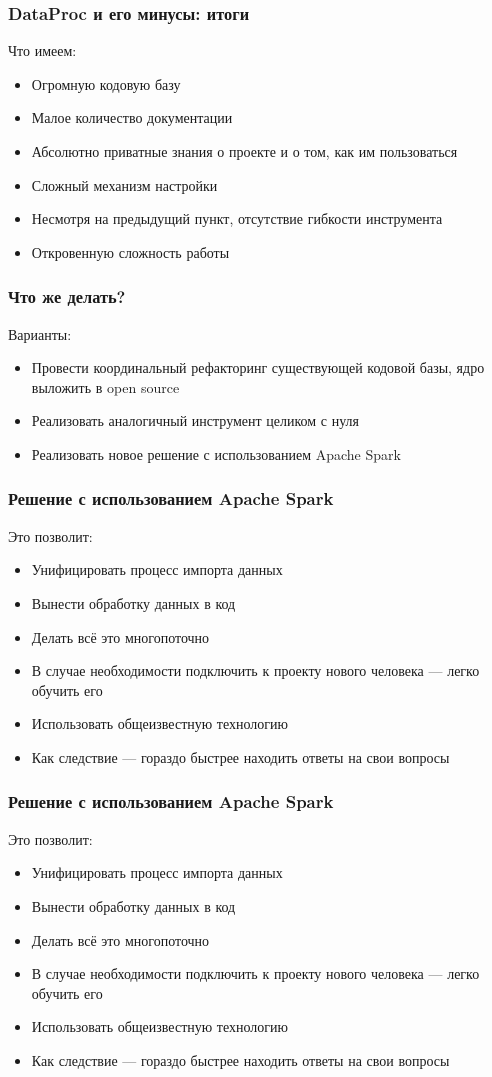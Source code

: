 \documentclass{beamer}
\begin{document}
\begin{frame}\frametitle{DataProc и его минусы: итоги}
Что имеем:
\begin{itemize}
    \item Огромную кодовую базу
    \item Малое количество документации
    \item Абсолютно приватные знания о проекте и о том, как им пользоваться
    \item Сложный механизм настройки
    \item Несмотря на предыдущий пункт, отсутствие гибкости инструмента
    \item Откровенную сложность работы
\end{itemize}
\end{frame}

\begin{frame}\frametitle{Что же делать?}
Варианты:
\begin{itemize}
    \item Провести координальный рефакторинг существующей кодовой базы, ядро выложить в open source
    \item Реализовать аналогичный инструмент целиком с нуля
    \item Реализовать новое решение с использованием Apache Spark
\end{itemize}
\end{frame}

\begin{frame}\frametitle{Решение с использованием Apache Spark}
Это позволит:
\begin{itemize}
    \item Унифицировать процесс импорта данных
    \item Вынести обработку данных в код
    \item Делать всё это многопоточно
    \item В случае необходимости подключить к проекту нового человека --- легко обучить его
    \item Использовать общеизвестную технологию
    \item Как следствие --- гораздо быстрее находить ответы на свои вопросы
\end{itemize}
\end{frame}

\begin{frame}\frametitle{Решение с использованием Apache Spark}
Это позволит:
\begin{itemize}
    \item Унифицировать процесс импорта данных
    \item Вынести обработку данных в код
    \item Делать всё это многопоточно
    \item В случае необходимости подключить к проекту нового человека --- легко обучить его
    \item Использовать общеизвестную технологию
    \item Как следствие --- гораздо быстрее находить ответы на свои вопросы
\end{itemize}
\end{frame}
\end{document}
